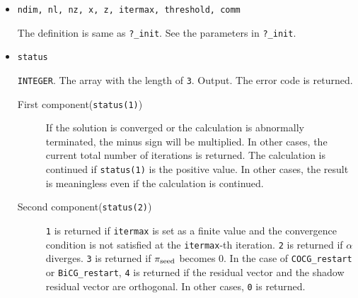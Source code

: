 \documentclass[12pt,titlepage]{article}
\begin{document}
\begin{itemize}

\item \verb|ndim, nl, nz, x, z, itermax, threshold, comm|

  The definition is same as \verb|?_init|. See the parameters in \verb|?_init|.

\item \verb|status|

  \verb|INTEGER|. 
  The array with the length of \verb|3|.
  Output. The error code is returned.
  \begin{description}
  \item [First component(\texttt{status(1)})]
   If the solution is converged or the calculation is abnormally terminated,
   the minus sign will be multiplied. In other cases, the current total number of iterations is returned.
   The calculation is continued if \verb|status(1)| is the positive value.
   In other cases, the result is meaningless even if the calculation is continued.
   
    
  \item [Second component(\texttt{status(2)})]
   \verb|1| is returned if \verb|itermax| is set as a finite value and 
   the convergence condition is not satisfied at the \verb|itermax|-th iteration. 
  \verb|2| is returned if $\alpha$ diverges.
  \verb|3| is returned if $\pi_{\rm seed}$ becomes 0. 
   In the case of  \verb|COCG_restart| or \verb|BiCG_restart|, \verb|4| is returned
   if the residual vector and the shadow residual vector are orthogonal.
    In other cases,  \verb|0| is returned.
    


\end{description}
\end{itemize}
\end{document}
